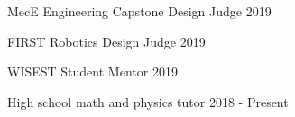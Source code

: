 
\begin{cventries}

  \cventry
    {MecE Engineering Capstone Design Judge} %
    {} %
    {} %
    {2019} %
    {}

  \cventry
    {FIRST Robotics Design Judge} %
    {} %
    {} %
    {2019} %
    {}

  \cventry
    {WISEST Student Mentor} %
    {} %
    {} %
    {2019} %
    {}

  \cventry
    {High school math and physics tutor} %
    {} %
    {} %
    {2018 - Present} %
    {}

\end{cventries}

